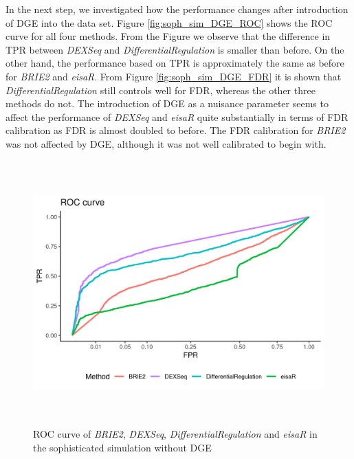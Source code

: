 In the next step, we investigated how the performance changes after introduction of DGE into the data set. Figure \ref{fig:soph_sim_DGE_ROC} shows the ROC curve for all four methods. From the Figure we observe that the difference in TPR between \emph{DEXSeq} and \emph{DifferentialRegulation} is smaller than before. On the other hand, the performance based on TPR is approximately the same as before for \emph{BRIE2} and \emph{eisaR}. From Figure \ref{fig:soph_sim_DGE_FDR} it is shown that \emph{DifferentialRegulation} still controls well for FDR, whereas the other three methods do not. The introduction of DGE as a nuisance parameter seems to affect the performance of \emph{DEXSeq} and \emph{eisaR} quite substantially in terms of FDR calibration as FDR is almost doubled to before. The FDR calibration for \emph{BRIE2} was not affected by DGE, although it was not well calibrated to begin with.

\begin{figure}[!htb]
\begin{center}
\includegraphics[width=6in,height=4in]{../figures/simulation/minnow_simulation_ROC.png}
\end{center}
\caption{ROC curve of \emph{BRIE2}, \emph{DEXSeq}, \emph{DifferentialRegulation} and \emph{eisaR} in the sophisticated simulation without DGE}
\label{fig:soph_sim_ROC}
\end{figure}

